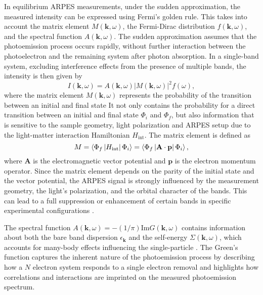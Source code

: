 In equilibrium ARPES measurements, under the sudden approximation, the measured intensity can be expressed using Fermi's golden rule.
This takes into account the matrix element $M(\mathbf{k}, \omega)$, the Fermi-Dirac distribution $f(\mathbf{k}, \omega)$, and the spectral function $A(\mathbf{k}, \omega)$.
The sudden approximation assumes that the photoemission process occurs rapidly, without further interaction between the photoelectron and the remaining system after photon absorption.
In a single-band system, excluding interference effects from the presence of multiple bands, the intensity is then given by
\begin{equation}
	I(\mathbf{k}, \omega) = A(\mathbf{k}, \omega)\left|M(\mathbf{k}, \omega)\right|^2f(\omega),
	\label{eq:spectral}
\end{equation}
where the matrix element $M(\mathbf{k}, \omega)$ represents the probability of the transition between an initial and final state
It not only contains the probability for a direct transition between an initial and final state $\Phi_i$ and $\Phi_f$, but also information that is sensitive to the sample geometry, light polarization and ARPES setup due to the light-matter interaction Hamiltonian $H_\text{int}$.
The matrix element is defined as
\begin{equation}
	M = \braket{\Phi_f\left|H_\text{int}\right|\Phi_i} = \braket{\Phi_f\left| \mathbf{A} \cdot \mathbf{p} \right|\Phi_i},
\end{equation}
where $\mathbf{A}$ is the electromagnetic vector potential and $\mathbf{p}$ is the electron momentum operator.
Since the matrix element depends on the parity of the initial state and the vector potential, the ARPES signal is strongly influenced by the measurement geometry, the light's polarization, and the orbital character of the bands.
This can lead to a full suppression or enhancement of certain bands in specific experimental configurations \cite{gierz_illuminating_2011, cao_mapping_2013,zhu_layer-by-layer_2013,schuler_polarization-modulated_2022}.

The spectral function $A(\mathbf{k}, \omega) = -(1/\pi)\text{Im}G(\mathbf{k}, \omega)$ contains information about both the bare band dispersion $\epsilon_\mathbf{k}$ and the self-energy $\Sigma(\mathbf{k}, \omega)$, which accounts for many-body effects influencing the single-particle \cite{mahan_many-particle_2000}.
The Green's function captures the inherent nature of the photoemission process by describing how a $N$ electron system responds to a single electron removal and highlights how correlations and interactions are imprinted on the measured photoemission spectrum.

